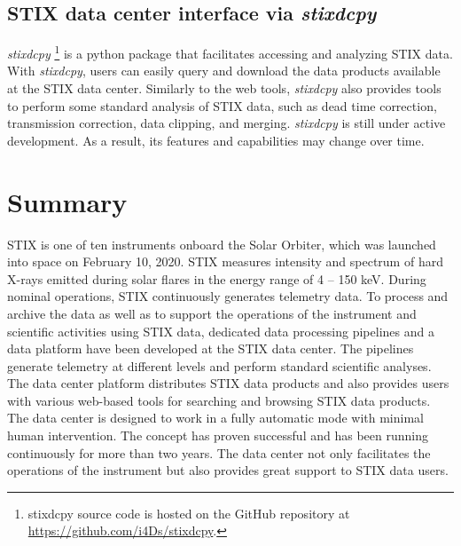 \documentclass[referee]{preaa} %
\begin{document}
\subsection{STIX data center interface via  {\it stixdcpy}}
{\it stixdcpy} \footnote{stixdcpy source code is hosted on the GitHub repository at \url{https://github.com/i4Ds/stixdcpy}.} is a python package that facilitates accessing and analyzing STIX data. 
With {\it stixdcpy}, users can easily query and download the data products available at the STIX data center.
Similarly to the web tools, {\it stixdcpy} also provides tools to perform some standard analysis of STIX data, such as dead time correction, transmission correction, data clipping, and merging. 
{\it stixdcpy} is still under active development. 
As a result, its features and 
capabilities may change over time.  

\section{Summary}
\label{sec:summary}
STIX is one of ten instruments onboard the Solar Orbiter, 
which was launched into space on February 10, 2020.
 STIX measures  
intensity and spectrum of hard X-rays emitted during solar flares
in the energy range of 4 -- 150 keV.  
 During nominal operations, STIX continuously generates telemetry data. 
 To process and archive the data as well as to support the operations of the
 instrument and scientific activities using STIX data, 
 dedicated data processing pipelines and a data platform have been 
 developed at the STIX data center.
 The pipelines generate telemetry at different levels and perform standard scientific analyses.  The data center platform distributes STIX data products and also provides users 
 with various web-based tools for searching and browsing STIX data products. 
  The data center is designed to work in a 
 fully automatic mode with minimal human intervention. The concept has proven successful 
 and has been running continuously for more than two years.
The data center not only facilitates the operations of the instrument but also provides great support to STIX data users.





\end{document}

